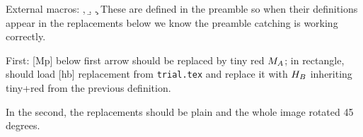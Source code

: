 \documentclass[a5paper,12pt]{memoir}
\begin{document}

External macros: \a, \b, \c. These are defined in the preamble so when their definitions appear in the replacements below we know the preamble catching is working correctly.

First: [Mp] below first arrow should be replaced by tiny red $M_A$; in rectangle, should load [hb] replacement from \texttt{trial.tex} and replace it with $H_B$ inheriting tiny+red from the previous definition.


\clearpage
In the second, the replacements should be plain and the whole image rotated 45 degrees.

\end{document}

